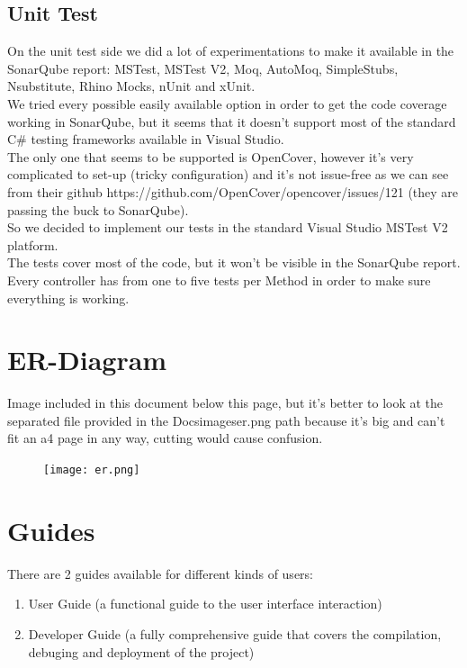 \documentclass[12pt]{article}
\begin{document}
\subsection{Unit Test}
On the unit test side we did a lot of experimentations to make it available in the 
SonarQube report: MSTest, MSTest V2, Moq, AutoMoq, SimpleStubs, Nsubstitute, Rhino Mocks, nUnit and xUnit.\\
\linebreak
We tried every possible easily available option in order to get the code coverage working in SonarQube, but it seems that it doesn't support most of the standard C\# testing frameworks available in Visual Studio.\\
\linebreak
The only one that seems to be supported is OpenCover, however it's very complicated to set-up (tricky configuration) and it's not issue-free as we can see from
their github https://github.com/OpenCover/opencover/issues/121 (they are passing the buck to SonarQube).\\
\linebreak
So we decided to implement our tests in the standard Visual Studio MSTest V2 platform.\\
The tests cover most of the code, but it won't be visible in the SonarQube report.\\
Every controller has from one to five tests per Method in order to make sure everything is working.
\section{ER-Diagram}
Image included in this document below this page, but it's better to look at the separated file provided in the Docs\/images\/er.png path because it's big and can't fit an a4 page in any way, cutting would cause confusion.
\begin{figure}[H]
\texttt{[image: er.png]}
\end{figure}

\section{Guides}
There are 2 guides available for different kinds of users:
\begin{enumerate}
\item User Guide (a functional guide to the user interface interaction)
\item Developer Guide (a fully comprehensive guide that covers the compilation, debuging and deployment of the project)
\end{enumerate}
\end{document}
